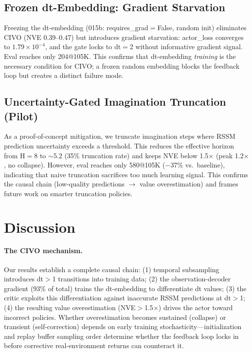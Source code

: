 \documentclass[10pt,letterpaper]{article}
\begin{document}
\subsection{Frozen dt-Embedding: Gradient Starvation}

Freezing the dt-embedding (015b: requires\_grad$=$False, random init) eliminates CIVO (NVE 0.39--0.47) but introduces gradient starvation: actor\_loss converges to $1.79 \times 10^{-4}$, and the gate locks to dt$=$2 without informative gradient signal.
Eval reaches only 204@105K.
This confirms that dt-embedding \emph{training} is the necessary condition for CIVO; a frozen random embedding blocks the feedback loop but creates a distinct failure mode.

\subsection{Uncertainty-Gated Imagination Truncation (Pilot)}

As a proof-of-concept mitigation, we truncate imagination steps where RSSM prediction uncertainty exceeds a threshold.
This reduces the effective horizon from H$=$8 to $\sim$5.2 (35\% truncation rate) and keeps NVE below 1.5$\times$ (peak 1.2$\times$, no collapse).
However, eval reaches only 580@105K ($-$37\% vs.\ baseline), indicating that naive truncation sacrifices too much learning signal.
This confirms the causal chain (low-quality predictions $\to$ value overestimation) and frames future work on smarter truncation policies.

\section{Discussion}

\paragraph{The CIVO mechanism.}
Our results establish a complete causal chain: (1) temporal subsampling introduces dt$>$1 transitions into training data; (2) the observation-decoder gradient (93\% of total) trains the dt-embedding to differentiate dt values; (3) the critic exploits this differentiation against inaccurate RSSM predictions at dt$>$1; (4) the resulting value overestimation (NVE$>$1.5$\times$) drives the actor toward incorrect policies.
Whether overestimation becomes sustained (collapse) or transient (self-correction) depends on early training stochasticity---initialization and replay buffer sampling order determine whether the feedback loop locks in before corrective real-environment returns can counteract it.
\end{document}
